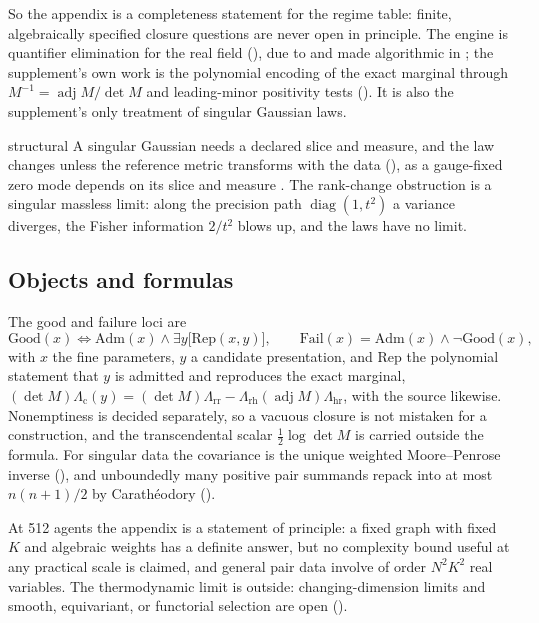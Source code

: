 So the appendix is a completeness statement for the regime table: finite, algebraically specified closure questions
are never open in principle. The engine is quantifier elimination for the real field
(), due to \citet{Tarski1951} and made algorithmic in
\citet{BasuPollackRoy2006}; the supplement's own work is the polynomial encoding of the exact marginal through
\(M^{-1}=\operatorname{adj}M/\det M\) and leading-minor positivity tests (). It is also
the supplement's only treatment of singular Gaussian laws.

\begin{analogy}{structural}
A singular Gaussian needs a declared slice and measure, and the law changes unless the reference metric transforms
with the data (), as a gauge-fixed zero mode depends on its slice and measure
\citep{FaddeevPopov1967}. The rank-change obstruction is a singular massless limit: along the precision path
\(\operatorname{diag}(1,t^2)\) a variance diverges, the Fisher information \(2/t^2\) blows up, and the laws have no limit.
\end{analogy}

\subsection{Objects and formulas}

The good and failure loci are
\[
\mathrm{Good}(x)\Longleftrightarrow\mathrm{Adm}(x)\wedge\exists y\bigl[\mathrm{Rep}(x,y)\bigr],
\qquad
\mathrm{Fail}(x)=\mathrm{Adm}(x)\wedge\neg\mathrm{Good}(x),
\]
with \(x\) the fine parameters, \(y\) a candidate presentation, and \(\mathrm{Rep}\) the polynomial statement that \(y\) is
admitted and reproduces the exact marginal, \((\det M)\Lambda_{\mathrm c}(y)=(\det M)\Lambda_{\mathrm{rr}}
-\Lambda_{\mathrm{rh}}(\operatorname{adj}M)\Lambda_{\mathrm{hr}}\), with the source likewise. Nonemptiness is decided
separately, so a vacuous closure is not mistaken for a construction, and the transcendental scalar
\(\tfrac12\log\det M\) is carried outside the formula. For singular data the covariance is the unique weighted
Moore--Penrose inverse (), and unboundedly many positive pair summands repack
into at most \(n(n+1)/2\) by Carath\'eodory ().

At 512 agents the appendix is a statement of principle: a fixed graph with fixed \(K\) and algebraic weights has a
definite answer, but no complexity bound useful at any practical scale is claimed, and general pair data involve of
order \(N^2K^2\) real variables. The thermodynamic limit is outside: changing-dimension limits and smooth, equivariant,
or functorial selection are open ().

